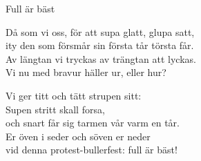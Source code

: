 \begin{song}{Full är bäst}


	
	
	Då som vi oss, för att supa glatt, glupa satt,\\
	ity den som försmår sin första tår törsta får.\\
	Av längtan vi tryckas av trängtan att lyckas.\\
	Vi nu med bravur häller ur, eller hur?

	Vi ger titt och tätt strupen sitt:\\
	Supen stritt skall forsa,\\
	och snart får sig tarmen vår varm en tår.\\
	Er öven i seder och söven er neder\\
	vid denna protest-bullerfest: full är bäst!
	
\end{song}
